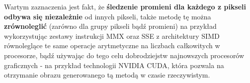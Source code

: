 Wartym zaznaczenia jest fakt, że \textbf{śledzenie promieni dla każdego z pikseli odbywa się niezależnie} od innych pikseli, także metodę tę można \textbf{zrównoleglić} (zarówno dla grupy pikseli bądź promieni) na przykład wykorzystując zestawy instrukcji MMX oraz SSE z architektury SIMD równoleglące te same operacje arytmetyczne na liczbach całkowitych w procesorze, bądź używając do tego celu dobrodziejstw najnowszych procesorów graficznych - na przykład technologii NVIDIA CUDA, która pozwala na otrzymanie obrazu generowanego tą metodą w czasie rzeczywistym.